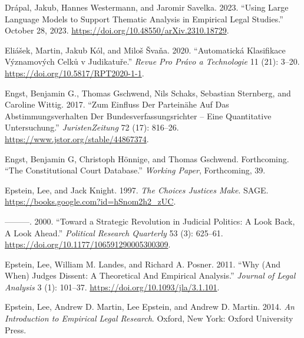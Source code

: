 \documentclass[
  11pt,
]{article}
\newlength{\cslhangindent}
\newenvironment{CSLReferences}[2] %
 {%
  \setlength{\parindent}{0pt}
  \ifodd #1 \everypar{\setlength{\hangindent}{\cslhangindent}}\ignorespaces\fi
  \ifnum #2 > 0
  \setlength{\parskip}{#2\baselineskip}
  \fi
 }%
 {}
\begin{document}
\begin{CSLReferences}{1}{0}
\leavevmode{}%
Drápal, Jakub, Hannes Westermann, and Jaromir Savelka. 2023. {``Using
{Large Language Models} to {Support Thematic Analysis} in {Empirical
Legal Studies}.''} October 28, 2023.
\url{https://doi.org/10.48550/arXiv.2310.18729}.

\leavevmode{}%
Eliášek, Martin, Jakub Kól, and Miloš Švaňa. 2020. {``Automatická
Klasifikace Významových Celků v Judikatuře.''} \emph{Revue Pro Právo a
Technologie} 11 (21): 3--20. \url{https://doi.org/10.5817/RPT2020-1-1}.

\leavevmode{}%
Engst, Benjamin G., Thomas Gschwend, Nils Schaks, Sebastian Sternberg,
and Caroline Wittig. 2017. {``Zum {Einfluss} Der {Parteinähe} Auf Das
{Abstimmungsverhalten} Der {Bundesverfassungsrichter} -- Eine
Quantitative {Untersuchung}.''} \emph{JuristenZeitung} 72 (17): 816--26.
\url{https://www.jstor.org/stable/44867374}.

\leavevmode{}%
Engst, Benjamin G, Christoph Hönnige, and Thomas Gschwend. Forthcoming.
{``The {Constitutional Court Database}.''} \emph{Working Paper},
Forthcoming, 39.

\leavevmode{}%
Epstein, Lee, and Jack Knight. 1997. \emph{The {Choices Justices Make}}.
{SAGE}. \url{https://books.google.com?id=hSnom2h2_zUC}.

\leavevmode{}%
---------. 2000. {``Toward a {Strategic Revolution} in {Judicial
Politics}: {A Look Back}, {A Look Ahead}.''} \emph{Political Research
Quarterly} 53 (3): 625--61.
\url{https://doi.org/10.1177/106591290005300309}.

\leavevmode{}%
Epstein, Lee, William M. Landes, and Richard A. Posner. 2011. {``Why
({And When}) {Judges Dissent}: {A Theoretical And Empirical
Analysis}.''} \emph{Journal of Legal Analysis} 3 (1): 101--37.
\url{https://doi.org/10.1093/jla/3.1.101}.

\leavevmode{}%
Epstein, Lee, Andrew D. Martin, Lee Epstein, and Andrew D. Martin. 2014.
\emph{An {Introduction} to {Empirical Legal Research}}. {Oxford, New
York}: {Oxford University Press}.


\end{CSLReferences}
\end{document}
